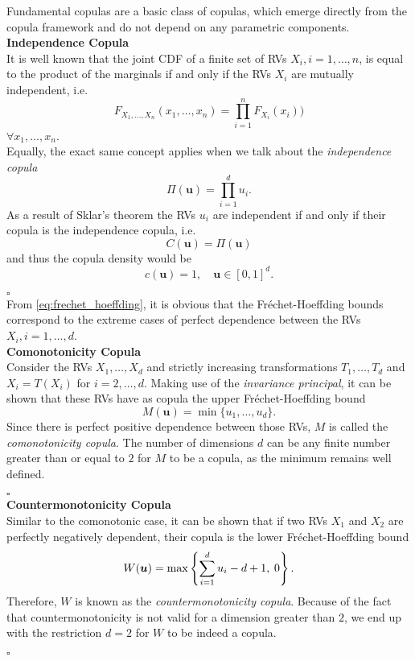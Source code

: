 
Fundamental copulas are a basic class of copulas, which emerge directly from the copula framework and do not depend on any parametric components. \\

\textbf{Independence Copula}\\
It is well known that the joint \ac{CDF} of a finite set of \acp{RV}
$X_i, i = 1, \ldots, n$, is equal to the product of the marginals if and only if the \acp{RV} $X_i$ are mutually independent, i.e.
$$
F_{X_{1}, \ldots, X_{n}}\left(x_{1}, \ldots, x_{n}\right)= \prod_{i=1}^{n} F_{X_{i}}\left(x_{i}\right)) 
$$
$\forall x_1, \ldots, x_n$.\\
Equally, the exact same concept applies when we talk about the \textit{independence copula}
\begin{equation}
\Pi (\bm{u}) = \prod \limits _{i = 1}^d u_i.
\end{equation}
As a result of Sklar's theorem the \ac{RV}s $u_i$ are independent if and only if their copula is the independence copula, i.e.
$$ C(\bm{u}) = \Pi (\bm{u}) $$
and thus the copula density would be 
$$c(\boldsymbol{u})=1, \quad \boldsymbol{u} \in[0,1]^{d}.$$

\hfill $\square$ \\


From \autoref{eq:frechet_hoeffding}, it is obvious that the Fr\'echet-Hoeffding bounds correspond to the extreme cases of perfect dependence between the \ac{RV}s $X_i, i = 1, \ldots, d$. \\

\textbf{Comonotonicity Copula}\\
Consider the \ac{RV}s $X_1, \ldots, X_d$ and strictly increasing transformations $T_1, \ldots, T_d$ and $X_i = T(X_i)$ for $i = 2, \ldots, d$. Making use of the \textit{invariance principal}, it can be shown that these \ac{RV}s have as copula the upper Fr\'echet-Hoeffding bound 
$$M(\bm{u}) = \min\{ u_1, \ldots, u_d \}.$$ Since there is perfect positive dependence between those \ac{RV}s, $M$ is called the \textit{comonotonicity copula}. The number of dimensions $d$ can be any finite number greater than or equal to $2$ for $M$ to be a copula, as the minimum remains well defined.

\hfill $\square$ \\



\textbf{Countermonotonicity Copula}\\
Similar to the comonotonic case, it can be shown that if two \acp{RV} $X_1$ and $X_2$ are perfectly negatively dependent, their copula is the lower Fr\'echet-Hoeffding bound
$$
W(\boldsymbol{u})=\max \left\{\sum\limits_{i=1}^{d} u_{i}-d+1, \hspace{0.25em} 0\right\}.
$$
Therefore, $W$ is known as the \textit{countermonotonicity copula}. Because of the fact that countermonotonicity is not valid for a dimension greater than $2$, we end up with the restriction $d=2$ for $W$ to be indeed a copula.

\hfill $\square$ \\








